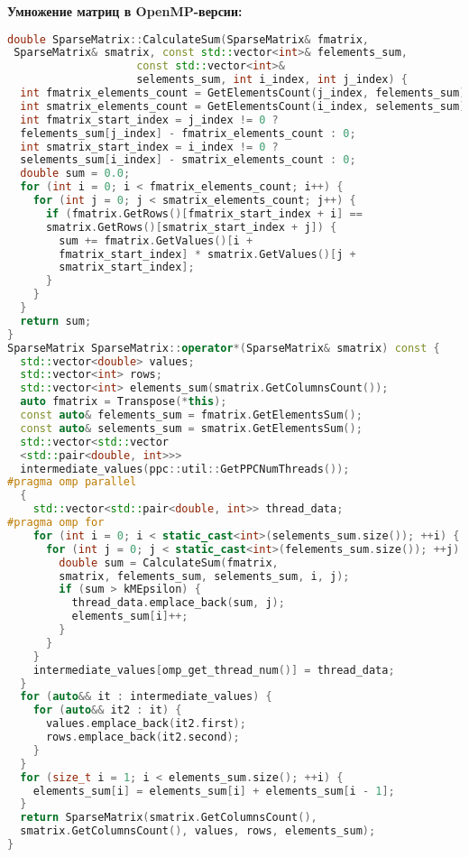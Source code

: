 \documentclass[12pt]{article}
\begin{document}
\textbf{Умножение матриц в OpenMP-версии:}
\begin{lstlisting}[language=C++]
double SparseMatrix::CalculateSum(SparseMatrix& fmatrix,
 SparseMatrix& smatrix, const std::vector<int>& felements_sum,
                    const std::vector<int>& 
                    selements_sum, int i_index, int j_index) {
  int fmatrix_elements_count = GetElementsCount(j_index, felements_sum);
  int smatrix_elements_count = GetElementsCount(i_index, selements_sum);
  int fmatrix_start_index = j_index != 0 ? 
  felements_sum[j_index] - fmatrix_elements_count : 0;
  int smatrix_start_index = i_index != 0 ? 
  selements_sum[i_index] - smatrix_elements_count : 0;
  double sum = 0.0;
  for (int i = 0; i < fmatrix_elements_count; i++) {
    for (int j = 0; j < smatrix_elements_count; j++) {
      if (fmatrix.GetRows()[fmatrix_start_index + i] == 
      smatrix.GetRows()[smatrix_start_index + j]) {
        sum += fmatrix.GetValues()[i + 
        fmatrix_start_index] * smatrix.GetValues()[j + 
        smatrix_start_index];
      }
    }
  }
  return sum;
}
SparseMatrix SparseMatrix::operator*(SparseMatrix& smatrix) const {
  std::vector<double> values;
  std::vector<int> rows;
  std::vector<int> elements_sum(smatrix.GetColumnsCount());
  auto fmatrix = Transpose(*this);
  const auto& felements_sum = fmatrix.GetElementsSum();
  const auto& selements_sum = smatrix.GetElementsSum();
  std::vector<std::vector
  <std::pair<double, int>>> 
  intermediate_values(ppc::util::GetPPCNumThreads());
#pragma omp parallel
  {
    std::vector<std::pair<double, int>> thread_data;
#pragma omp for
    for (int i = 0; i < static_cast<int>(selements_sum.size()); ++i) {
      for (int j = 0; j < static_cast<int>(felements_sum.size()); ++j) {
        double sum = CalculateSum(fmatrix, 
        smatrix, felements_sum, selements_sum, i, j);
        if (sum > kMEpsilon) {
          thread_data.emplace_back(sum, j);
          elements_sum[i]++;
        }
      }
    }
    intermediate_values[omp_get_thread_num()] = thread_data;
  }
  for (auto&& it : intermediate_values) {
    for (auto&& it2 : it) {
      values.emplace_back(it2.first);
      rows.emplace_back(it2.second);
    }
  }
  for (size_t i = 1; i < elements_sum.size(); ++i) {
    elements_sum[i] = elements_sum[i] + elements_sum[i - 1];
  }
  return SparseMatrix(smatrix.GetColumnsCount(),
  smatrix.GetColumnsCount(), values, rows, elements_sum);
}
\end{lstlisting}
\end{document}
